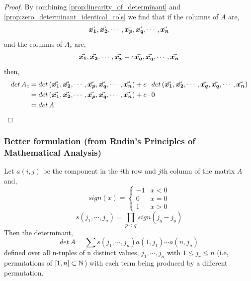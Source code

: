 \documentclass[MathsNotesBase.tex]{subfiles}
\begin{document}
{		
		\begin{proof}
			By combining \autoref{prop:linearity_of_determinant} and \autoref{prop:zero_determinant_identical_cols} we find that if the columns of $A$ are,
			\[ \vec{\bm{x_1}}, \vec{\bm{x_2}}, \cdots ,  \vec{\bm{x_p}}, \vec{\bm{x_q}}, \cdots, \vec{\bm{x_n}} \]
			and the columns of $A_c$ are,
			\[ \vec{\bm{x_1}}, \vec{\bm{x_2}}, \cdots , \vec{\bm{x_p}} + c\vec{\bm{x_q}}, \vec{\bm{x_q}}, \cdots , \vec{\bm{x_n}} \]
			then,
			\begin{align*} 
				det\,A_c &= det\,(\vec{\bm{x_1}}, \vec{\bm{x_2}}, \cdots ,  \vec{\bm{x_p}}, \vec{\bm{x_q}}, \cdots, \vec{\bm{x_n}}) + c \cdot det\,(\vec{\bm{x_1}}, \vec{\bm{x_2}}, \cdots ,  \vec{\bm{x_q}}, \vec{\bm{x_q}}, \cdots, \vec{\bm{x_n}})\\
						 &= det\,(\vec{\bm{x_1}}, \vec{\bm{x_2}}, \cdots ,  \vec{\bm{x_p}}, \vec{\bm{x_q}}, \cdots, \vec{\bm{x_n}}) + c \cdot 0\\
						 &= det\,A
			\end{align*}
		\end{proof}
	
		\subsubsection{Better formulation \tiny{(from Rudin's Principles of Mathematical Analysis)}}\label{sssection:determinant_formula}
		Let $a(i,j)$ be the component in the $i$th row and $j$th column of the matrix $A$ and, 
		\[ sign(x) = \begin{cases} 
						-1 & x < 0 \\
						0 & x = 0 \\
						1 & x > 0 
					 \end{cases} 
		\]
		\[ s(j_1,\cdots,j_n) = \prod_{p < q}{sign(j_q - j_p)} \]
		Then the determinant,
		\[ det\, A = \sum s(j_1,\cdots,j_n)a(1,j_1) \cdots a(n,j_n) \]
		defined over all n-tuples of n distinct values, $j_1, \cdots, j_n$ with ${1 \leq j_r \leq n}$ (i.e, permutations of $[1,n] \subset \mathbb{N}^{}$) with each term being produced by a different permutation. 
		\bigskip
		
}
\end{document}

